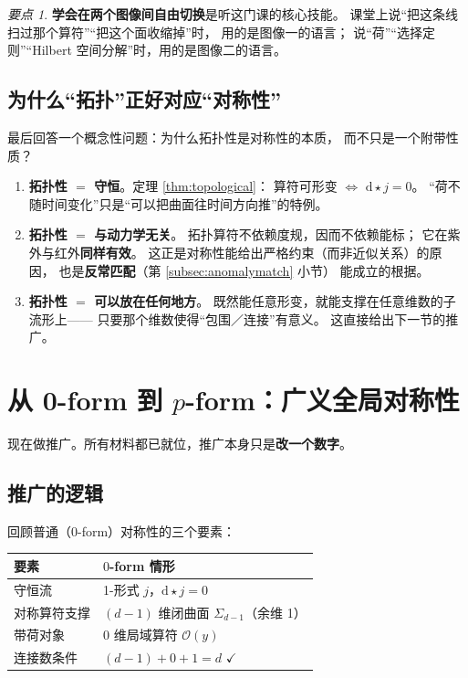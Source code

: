 \documentclass[UTF8,a4paper,11pt]{ctexart}
\theoremstyle{plain}
\theoremstyle{definition}
\theoremstyle{remark}
\newtheorem{keypoint}{要点}[section]
\newcommand{\ext}{\mathrm{d}}          %
\newcommand{\hs}{\star}                %
\newcommand{\Op}{\mathcal{O}}
\newcommand{\Ssurf}{\Sigma}
\begin{document}
\begin{keypoint}
\label{kp:two-pictures}
\textbf{学会在两个图像间自由切换}是听这门课的核心技能。
课堂上说“把这条线扫过那个算符”“把这个面收缩掉”时，
用的是图像一的语言；
说“荷”“选择定则”“Hilbert 空间分解”时，用的是图像二的语言。
\end{keypoint}

\subsection{为什么“拓扑”正好对应“对称性”}

最后回答一个概念性问题：为什么拓扑性是对称性的本质，
而不只是一个附带性质？

\begin{enumerate}[label=(\arabic*)]
  \item \textbf{拓扑性 $=$ 守恒}。定理 \ref{thm:topological}：
        算符可形变 $\Leftrightarrow$ $\ext\hs j=0$。
        “荷不随时间变化”只是“可以把曲面往时间方向推”的特例。
  \item \textbf{拓扑性 $=$ 与动力学无关}。
        拓扑算符不依赖度规，因而不依赖能标；
        它在紫外与红外\textbf{同样有效}。
        这正是对称性能给出严格约束（而非近似关系）的原因，
        也是\textbf{反常匹配}（第 \ref{subsec:anomalymatch} 小节）
        能成立的根据。
  \item \textbf{拓扑性 $=$ 可以放在任何地方}。
        既然能任意形变，就能支撑在任意维数的子流形上——
        只要那个维数使得“包围／连接”有意义。
        这直接给出下一节的推广。
\end{enumerate}

\section{从 0-form 到 \texorpdfstring{$p$}{p}-form：广义全局对称性}
\label{sec:pform}

现在做推广。所有材料都已就位，推广本身只是\textbf{改一个数字}。

\subsection{推广的逻辑}

回顾普通（$0$-form）对称性的三个要素：
\begin{center}
\begin{tabular}{@{}ll@{}}
\toprule
要素 & $0$-form 情形 \\
\midrule
守恒流 & 1-形式 $j$，$\ext\hs j=0$ \\
对称算符支撑 & $(d-1)$ 维闭曲面 $\Ssurf_{d-1}$（余维 1）\\
带荷对象 & $0$ 维局域算符 $\Op(y)$ \\
连接数条件 & $(d-1)+0+1=d$ $\checkmark$ \\
\bottomrule
\end{tabular}
\end{center}
\end{document}
